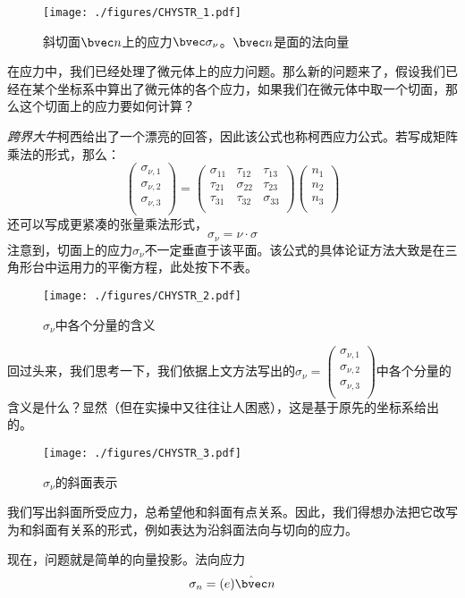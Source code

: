 

\begin{figure}[ht]
\centering
\texttt{[image: ./figures/CHYSTR\_1.pdf]}
\caption{斜切面$\bvec n$上的应力$\bvec \sigma_\nu$。$\bvec n$是面的法向量} \label{CHYSTR_fig1}
\end{figure}

在应力中，我们已经处理了微元体上的应力问题。那么新的问题来了，假设我们已经在某个坐标系中算出了微元体的各个应力，如果我们在微元体中取一个切面，那么这个切面上的应力要如何计算？

\textsl{跨界大牛}柯西给出了一个漂亮的回答，因此该公式也称柯西应力公式。若写成矩阵乘法的形式，那么：
\begin{equation}
\begin{pmatrix}
\sigma_{\nu,1}\\
\sigma_{\nu,2}\\
\sigma_{\nu,3}\\
\end{pmatrix}
=
\begin{pmatrix}
\sigma_{11} & \tau_{12} & \tau_{13} \\
\tau_{21} & \sigma_{22} & \tau_{23} \\
\tau_{31} & \tau_{32} & \sigma_{33} \\
\end{pmatrix}
\begin{pmatrix}
n_1\\
n_2\\
n_3\\
\end{pmatrix}
\end{equation}
还可以写成更紧凑的张量乘法形式，
\begin{equation}
\sigma_\nu = \nu \cdot \sigma
\end{equation}
注意到，切面上的应力$\sigma_\nu$不一定垂直于该平面。该公式的具体论证方法大致是在三角形台中运用力的平衡方程，此处按下不表。

\begin{figure}[ht]
\centering
\texttt{[image: ./figures/CHYSTR\_2.pdf]}
\caption{$\sigma_\nu$中各个分量的含义} \label{CHYSTR_fig2}
\end{figure}

回过头来，我们思考一下，我们依据上文方法写出的$\sigma_\nu=
\begin{pmatrix}
\sigma_{\nu,1}\\
\sigma_{\nu,2}\\
\sigma_{\nu,3}\\
\end{pmatrix}$中各个分量的含义是什么？显然（但在实操中又往往让人困惑），这是基于原先的坐标系给出的。

\begin{figure}[ht]
\centering
\texttt{[image: ./figures/CHYSTR\_3.pdf]}
\caption{$\sigma_\nu$的斜面表示} \label{CHYSTR_fig3}
\end{figure}
我们写出斜面所受应力，总希望他和斜面有点关系。因此，我们得想办法把它改写为和斜面有关系的形式，例如表达为沿斜面法向与切向的应力。

现在，问题就是简单的向量投影。法向应力
$$\sigma_n = (e) \hat \bvec n $$
